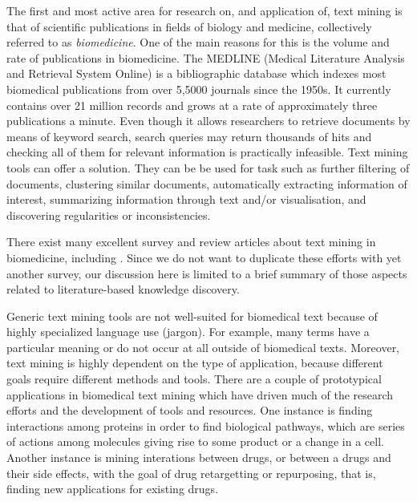 \documentclass[11pt,oneside,a4paper]{report}
\newcommand{\EM}[1]{\todo[inline,author=EM,color=yellow]{#1}}
\begin{document}
The first and most active area for research on, and application of, text mining is that of scientific publications in fields of biology and medicine, collectively referred to as \emph{biomedicine}.
One of the main reasons for this is the volume and rate of publications in biomedicine.
The MEDLINE (Medical Literature Analysis and Retrieval System Online) is a bibliographic database which indexes most biomedical publications from over 5,5000 journals since the 1950s.  
It currently contains over 21 million records and grows at a rate of approximately three publications a minute.\EM{ref}
Even though it allows researchers to retrieve documents by means of keyword search, search queries may return thousands of hits and checking all of them for relevant information is practically infeasible.
Text mining tools can offer a solution.
They can be be used for task such as further filtering of documents, clustering similar documents, automatically extracting information of interest, summarizing information through text and/or visualisation, and discovering regularities or inconsistencies.

There exist many excellent survey and review articles about text mining in biomedicine, including
\citep{Neves2012Survey,Simpson2012Biomedical,Andronis2011Literature,Ananiadou2010Event,RodriguezEsteban2009Biomedical,Zweigenbaum2009Advanced,Cohen2008Getting,Zweigenbaum2007Frontiers,Ananiadou2006,Erhardt2006Status,JenEA06,Spasic2005Text,Cohen2005Survey,Krauthammer2004Term,Blake2011Text}.
Since we do not want to duplicate these efforts with yet another survey, our discussion here is limited to a brief summary of those aspects related to literature-based knowledge discovery.  

Generic text mining tools are not well-suited for biomedical text because of highly specialized language use (jargon). 
For example, many terms have a particular meaning or do not occur at all outside of biomedical texts.
Moreover, text mining is highly dependent on the type of application, because different goals require different methods and tools.
There are a couple of prototypical applications in biomedical text mining which have driven much of the research efforts and the development of tools and resources.
One instance is finding interactions among proteins in order to find biological pathways, which are series of actions among molecules giving rise to some product or a change in a cell.
Another instance is mining interations between drugs, or between a drugs and their side effects, with the goal of drug retargetting or repurposing, that is, finding new applications for existing drugs.
\end{document}
